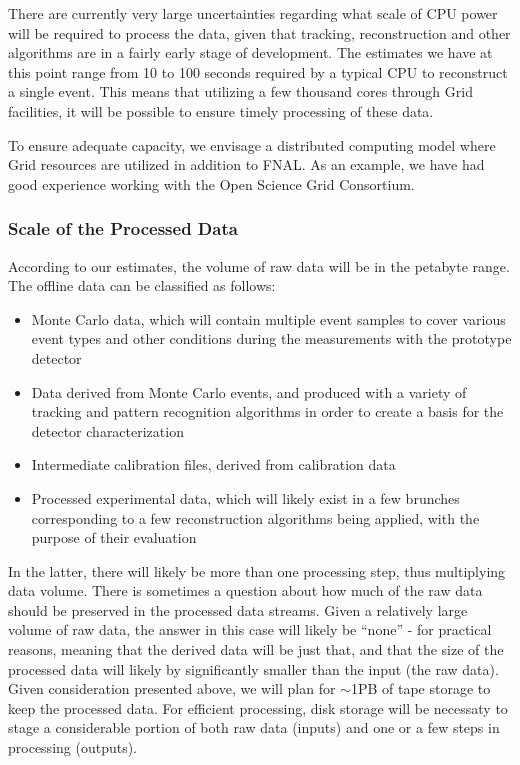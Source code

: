 There are currently very large uncertainties regarding what scale of CPU power will be required to process the data, given that tracking, reconstruction and
other algorithms are in a fairly early stage of development. The estimates we have at this point range from 10 to 100 seconds required by a typical
CPU to reconstruct a single event. This means that utilizing a few thousand cores through Grid facilities, it will be possible to ensure timely processing of these data.

To ensure adequate capacity, we envisage a distributed computing model where Grid resources are utilized in addition to FNAL.
As an example, we have had good experience working with the Open Science Grid Consortium.



\subsubsection{Scale of the Processed Data}
According to our estimates, the volume of raw data will be in the petabyte range. The offline data can be classified as follows:
\begin{itemize}
\item Monte Carlo data, which will contain multiple event samples to cover various event types and other conditions during the measurements with the prototype detector
\item Data derived from Monte Carlo events, and produced with a variety of tracking and pattern recognition algorithms in order to create a basis for the detector characterization
\item Intermediate calibration files, derived from calibration data
\item Processed experimental data, which will likely exist in a few brunches corresponding to a few reconstruction algorithms being applied, with the purpose of their evaluation
\end{itemize}

In the latter, there will likely be more than one processing step, thus multiplying data volume. There is sometimes a question about how much of the raw data should be preserved in
the processed data streams. Given a relatively large volume of raw data, the answer in this case will likely be ``none'' - for practical reasons, meaning that the derived data will
be just that, and that the size of the processed data will likely by significantly smaller than the input (the raw data). Given consideration presented above, we will plan for
$\sim$1PB of tape storage to keep the processed data. For efficient processing, disk storage will be necessaty to stage a considerable portion of both raw data (inputs) and
one or a few steps in processing (outputs).

